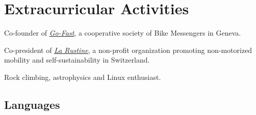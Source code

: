 \documentclass[]{plushcv}
\begin{document}
\begin{minipage}[t]{0.70\textwidth}
\section{Extracurricular Activities} 
\sectionsep
\sectionsep
\begin{tightemize}
\item Co-founder of \href{http://www.go-fast.ch/}{\underline{\textit{Go-Fast}}}, a cooperative society of Bike Messengers in Geneva.
\item Co-president of \href{http://www.larustine.bike/}{\underline{\textit{La Rustine}}}, a non-profit organization promoting non-motorized mobility and self-sustainability in Switzerland.
\item Rock climbing, astrophysics and Linux enthusiast.
\end{tightemize}
\end{minipage} 
\hfill
\begin{minipage}[t]{0.25\textwidth} 
\sectionsep
\sectionsep
\sectionsep
\sectionsep
\sectionsep
\sectionsep
\sectionsep
\sectionsep

\subsection{Languages}
\sectionsep
\runsubsection{}


\sectionsep
\runsubsection{}


\end{minipage}
\end{document}
